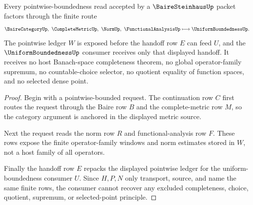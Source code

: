 \begin{theorem}
\label{thm:baire-steinhaus-pointwise-bounded-handoff}
Every pointwise-boundedness read accepted by a $\BaireSteinhausUp$ packet factors through the finite route
$$
\BaireCategoryUp,\ \CompleteMetricUp,\ \NormUp,\ \FunctionalAnalysisUp \longmapsto \UniformBoundednessUp .
$$
The pointwise ledger $W$ is exposed before the handoff row $E$ can feed $U$, and the $\UniformBoundednessUp$ consumer receives only that displayed handoff. It receives no host Banach-space completeness theorem, no global operator-family supremum, no countable-choice selector, no quotient equality of function spaces, and no selected dense point.
\end{theorem}
\begin{proof}
Begin with a pointwise-bounded request. The continuation row $C$ first routes the request through the Baire row $B$ and the complete-metric row $M$, so the category argument is anchored in the displayed metric source.

Next the request reads the norm row $R$ and functional-analysis row $F$. These rows expose the finite operator-family windows and norm estimates stored in $W$, not a host family of all operators.

Finally the handoff row $E$ repacks the displayed pointwise ledger for the uniform-boundedness consumer $U$. Since $H,P,N$ only transport, source, and name the same finite rows, the consumer cannot recover any excluded completeness, choice, quotient, supremum, or selected-point principle.
\end{proof}


\begin{closurestatus}{\BaireSteinhausUp}
  \theoryclosure{\seedClosure}
  \formalstatus{\unformalizedV}
\end{closurestatus}
